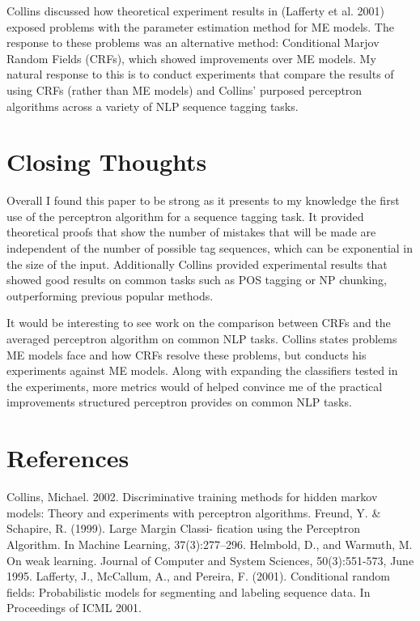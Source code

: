 \documentclass[fleqn,11pt]{wlpeerj} %
\begin{document}
Collins discussed how theoretical experiment results in (Lafferty et al. 2001) exposed problems with the parameter estimation method for ME models. The response to these problems was an alternative method: Conditional Marjov Random Fields (CRFs), which showed improvements over ME models. My natural response to this is to conduct experiments that compare the results of using CRFs (rather than ME models) and Collins' purposed perceptron algorithms across a variety of NLP sequence tagging tasks.

\section*{Closing Thoughts}

Overall I found this paper to be strong as it presents to my knowledge the first use of the perceptron algorithm for a sequence tagging task. It provided theoretical proofs that show the number of mistakes that will be made are independent of the number of possible tag sequences, which can be exponential in the size of the input. Additionally Collins provided experimental results that showed good results on common tasks such as POS tagging or NP chunking, outperforming previous popular methods.

It would be interesting to see work on the comparison between CRFs and the averaged perceptron algorithm on common NLP tasks. Collins states problems ME models face and how CRFs resolve these problems, but conducts his experiments against ME models. Along with expanding the classifiers tested in the experiments, more metrics would of helped convince me of the practical improvements structured perceptron provides on common NLP tasks.

\section*{References}
Collins, Michael. 2002. Discriminative training methods
for hidden markov models: Theory and \hspace*{1em} experiments
with perceptron algorithms.\newline
Freund, Y. \& Schapire, R. (1999). Large Margin Classi-
fication using the Perceptron Algorithm. \hspace*{1em} In Machine
Learning, 37(3):277–296. \newline
Helmbold, D., and Warmuth, M. On weak learning. Journal
of Computer and System Sciences, \hspace*{1em}50(3):551-573,
June 1995. \newline
Lafferty, J., McCallum, A., and Pereira, F. (2001). Conditional
random fields: Probabilistic \hspace*{1em}models for segmenting
and labeling sequence data. In Proceedings of
ICML 2001.
\end{document}
